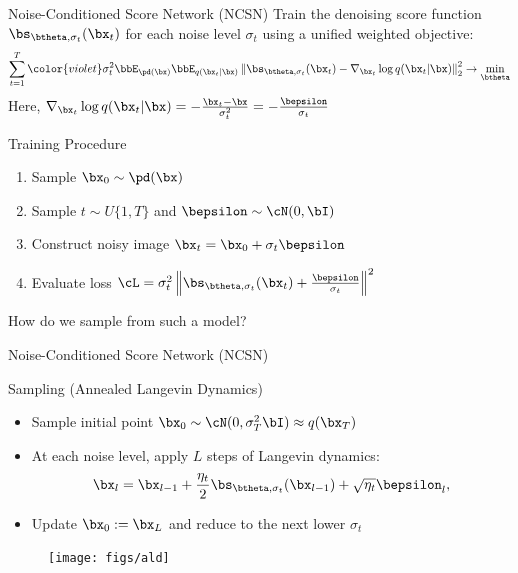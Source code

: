 \documentclass{beamer}
\begin{document}
\begin{frame}{Noise-Conditioned Score Network (NCSN)}
	Train the denoising score function $\bs_{\btheta, \sigma_t}(\bx_t)$ for each noise level $\sigma_t$ using a unified weighted objective:
	\vspace{-0.2cm}
	\[
		\sum_{t=1}^T {\color{violet}\sigma_t^2} \bbE_{\pd(\bx)} \bbE_{q(\bx_t | \bx)}\left\| \bs_{\btheta, \sigma_t}(\bx_t) - \nabla_{\bx_t} \log q(\bx_t | \bx) \right\|_2^2 \rightarrow \min_{\btheta}
	\]
    \eqpause
	Here, $\nabla_{\bx_t} \log q(\bx_t | \bx) = - \frac{\bx_t - \bx}{\sigma_t^2} = - \frac{\bepsilon}{\sigma_t}$
    \eqpause
	\begin{block}{Training Procedure}
		\begin{enumerate}
			\item Sample $\bx_0 \sim \pd(\bx)$
			\item Sample $t \sim U\{1, T\}$ and $\bepsilon \sim \cN(0, \bI)$
			\item Construct noisy image $\bx_t = \bx_0 + \sigma_t \bepsilon$
			\item Evaluate loss $ \cL = \sigma_t^2 \left\| \bs_{\btheta, \sigma_t}(\bx_t) + \frac{\bepsilon}{\sigma_t} \right\|^2 $
		\end{enumerate}
		\vspace{-0.3cm}
	\end{block}
    \eqpause
	How do we sample from such a model?
\end{frame}
\begin{frame}{Noise-Conditioned Score Network (NCSN)}
	\begin{block}{Sampling (Annealed Langevin Dynamics)}
		\begin{itemize}
			\item Sample initial point $\bx_0 \sim \cN(0, \sigma_T^2 \bI) \approx q(\bx_T)$
			\item At each noise level, apply $L$ steps of Langevin dynamics:
			\vspace{-0.2cm}
			\[
				\bx_l = \bx_{l-1} + \frac{\eta_t}{2} \bs_{\btheta, \sigma_t}(\bx_{l-1}) + \sqrt{\eta_t} \bepsilon_l,
			\] 
			\vspace{-0.5cm}
			\item Update $\bx_0 := \bx_L$ and reduce to the next lower $\sigma_t$
		\end{itemize}
	\end{block}
    \eqpause
	\begin{figure}
		\texttt{[image: figs/ald]}
	\end{figure}
\end{frame}
\end{document}
